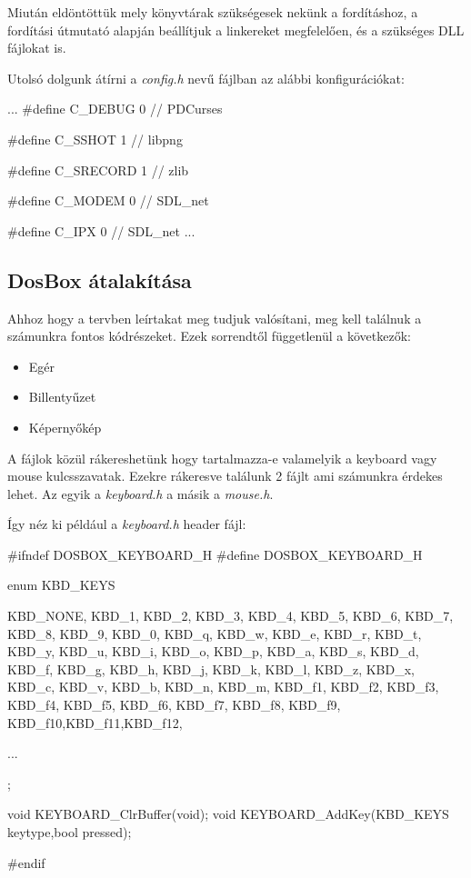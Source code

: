 Miután eldöntöttük mely könyvtárak szükségesek nekünk a fordításhoz, a fordítási útmutató alapján beállítjuk a linkereket megfelelően, és a szükséges DLL fájlokat is. 

Utolsó dolgunk átírni a \textit{config.h} nevű fájlban az alábbi konfigurációkat: 

\begin{cpp}

    ...
    #define C_DEBUG 0 // PDCurses

    #define C_SSHOT 1 // libpng

    #define C_SRECORD 1 // zlib

    #define C_MODEM 0 // SDL_net 

    #define C_IPX 0 // SDL_net 
    ...
\end{cpp}

\subsection{DosBox átalakítása}

Ahhoz hogy a tervben leírtakat meg tudjuk valósítani, meg kell találnuk a számunkra fontos kódrészeket. Ezek sorrendtől függetlenül a következők:

\begin{itemize}
    \item Egér 
    \item Billentyűzet
    \item Képernyőkép
\end{itemize}

A fájlok közül rákereshetünk hogy tartalmazza-e valamelyik a keyboard vagy mouse kulcsszavatak. Ezekre rákeresve találunk 2 fájlt ami számunkra érdekes lehet. Az egyik a \textit{keyboard.h} a másik a \textit{mouse.h}.

Így néz ki például a \textit{keyboard.h} header fájl:

\begin{cpp}
    #ifndef DOSBOX_KEYBOARD_H
    #define DOSBOX_KEYBOARD_H
    
    enum KBD_KEYS {
        KBD_NONE,
        KBD_1,	KBD_2,	KBD_3,	KBD_4,	KBD_5,	KBD_6,	KBD_7,	
        KBD_8,	KBD_9,	KBD_0,		
        KBD_q,	KBD_w,	KBD_e,	KBD_r,	KBD_t,	KBD_y,	KBD_u,	
        KBD_i,	KBD_o,	KBD_p,	
        KBD_a,	KBD_s,	KBD_d,	KBD_f,	KBD_g,	KBD_h,	KBD_j,	
        KBD_k,	KBD_l,	KBD_z,
        KBD_x,	KBD_c,	KBD_v,	KBD_b,	KBD_n,	KBD_m,	
        KBD_f1,	KBD_f2,	KBD_f3,	KBD_f4,	KBD_f5,	KBD_f6,	KBD_f7,	
        KBD_f8,	KBD_f9,	KBD_f10,KBD_f11,KBD_f12,

        ...
        
    };
    
    void KEYBOARD_ClrBuffer(void);
    void KEYBOARD_AddKey(KBD_KEYS keytype,bool pressed);
    
    #endif
\end{cpp}

